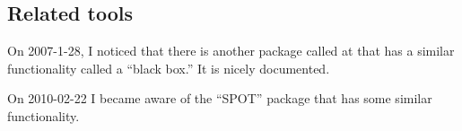 
\subsection{Related tools}

On 2007-1-28,
I noticed that there is another package called 
at 
that has a similar functionality called a ``black box.''
It is nicely documented.

On 2010-02-22 I became aware of the ``SPOT'' package
that has some similar functionality.
